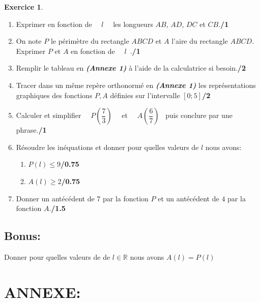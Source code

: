\documentclass[a4paper,10pt]{article}
\newcommand{\R}{\mathbb{R}}
\theoremstyle{definition}
\theoremstyle{definition}
\newtheorem{exo}{Exercice}
\begin{document}
\begin{exo}
	\begin{enumerate}
		\item Exprimer en fonction de ~~$l$~~ les longueurs $AB$, $AD$, $DC$ et $CB$.\hfill\textbf{/1}\\
		\item On note $P$ le périmètre du rectangle $ABCD$ et $A$ l'aire du rectangle $ABCD$. Exprimer $P$ et $A$ en fonction de ~~$l$~.\hfill\textbf{/1}\\
		\item Remplir le tableau en \textbf{\textit{(Annexe 1)}} à l'aide de la calculatrice si besoin.\hfill\textbf{/2}\\
		\item Tracer dans un même repère orthonormé en \textit{ \textbf{(Annexe 1)}} les représentations graphiques des fonctions $P, A$ définies sur l'intervalle $[0;5]$\hfill\textbf{/2}\\ 
		\item Calculer et simplifier ~~$P\left(\dfrac{7}{3}\right)$~~ et ~~$A\left(\dfrac{6}{7}\right)$~ puis conclure par une phrase.\hfill\textbf{/1}\\
		\item Résoudre les inéquations et donner pour quelles valeurs de $l$ nous avons:
		\begin{enumerate}
			\item $P(l)\leq  9$\hfill\textbf{/0.75}
			\item $A(l)\geq 2$\hfill\textbf{/0.75}\\
		\end{enumerate}  
		\item  Donner un antécédent de 7 par la fonction $P$ et un antécédent de $4$ par la fonction $A$.\hfill\textbf{/1.5}		
	\end{enumerate}	
\subsection*{Bonus:}
Donner pour quelles valeurs de de $l\in\R$ nous avons $A(l)=P(l)$ 
\end{exo}





\newpage
\section*{ANNEXE:}
\end{document}
